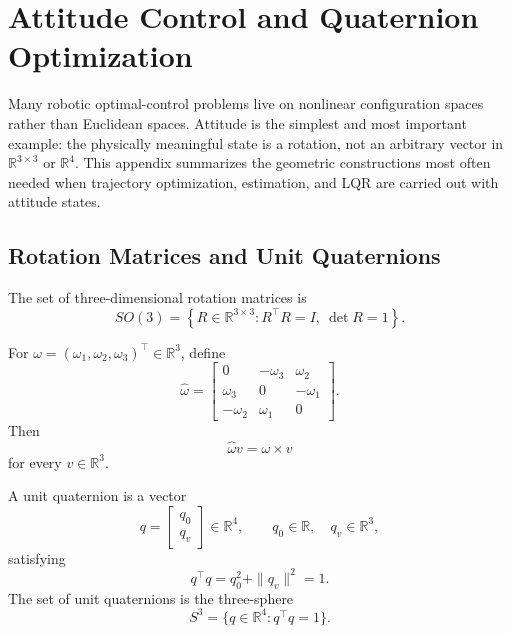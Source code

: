 \section{Attitude Control and Quaternion Optimization}
\label{sec:app-attitude-control-and-quaternion-optimization}

\begin{remark}
	Many robotic optimal-control problems live on nonlinear configuration spaces rather than Euclidean spaces. Attitude is the simplest and most important example: the physically meaningful state is a rotation, not an arbitrary vector in $\mathbb{R}^{3\times 3}$ or $\mathbb{R}^{4}$. This appendix summarizes the geometric constructions most often needed when trajectory optimization, estimation, and LQR are carried out with attitude states.
\end{remark}

\subsection{Rotation Matrices and Unit Quaternions}
\label{sec:app-rotation-matrices-and-unit-quaternions}

\begin{definition}\label{def:app-special-orthogonal-group}
	The set of three-dimensional rotation matrices is
	\[
		SO(3)
		=
		\left\{
			R \in \mathbb{R}^{3\times 3}
			:
			R^\top R = I,
			\ \det R = 1
		\right\}.
	\]
\end{definition}

\begin{definition}\label{def:app-hat-map}
	For $\omega=(\omega_1,\omega_2,\omega_3)^\top \in \mathbb{R}^{3}$, define
	\[
		\widehat{\omega}
		=
		\begin{bmatrix}
			0          & -\omega_3 & \omega_2 \\
			\omega_3   & 0         & -\omega_1 \\
			-\omega_2  & \omega_1  & 0
		\end{bmatrix}.
	\]
	Then
	\[
		\widehat{\omega}v=\omega \times v
	\]
	for every $v \in \mathbb{R}^{3}$.
\end{definition}

\begin{definition}\label{def:app-unit-quaternion}
	A unit quaternion is a vector
	\[
		q=
		\begin{bmatrix}
			q_0 \\
			q_v
		\end{bmatrix}
		\in \mathbb{R}^{4},
		\qquad
		q_0 \in \mathbb{R},
		\quad
		q_v \in \mathbb{R}^{3},
	\]
	satisfying
	\[
		q^\top q = q_0^2+\|q_v\|^2 = 1.
	\]
	The set of unit quaternions is the three-sphere
	\[
		S^3=\{q \in \mathbb{R}^{4}:q^\top q=1\}.
	\]
\end{definition}

